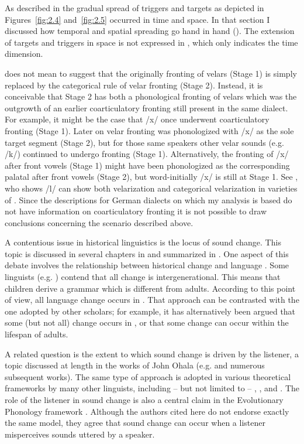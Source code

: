 \begin{xlist}
\begin{xlist}
As described in  the gradual spread of triggers and targets as depicted in Figures~\ref{fig:2.4} and~\ref{fig:2.5} occurred in time and space. In that section I discussed how temporal and spatial spreading go hand in hand (). The extension of targets and triggers in space is not expressed in , which only indicates the time dimension.

 does not mean to suggest that the originally  fronting of velars (Stage 1) is simply replaced by the categorical rule of velar fronting (Stage 2). Instead, it is conceivable that Stage 2 has both a phonological fronting of velars which was the outgrowth of an earlier coarticulatory fronting still present in the same dialect. For example, it might be the case that /x/ once underwent coarticulatory fronting (Stage 1). Later on velar fronting was phonologized with /x/ as the sole target segment (Stage 2), but for those same speakers other velar sounds (e.g. /k/) continued to undergo  fronting (Stage 1). Alternatively, the  fronting of /x/ after front vowels (Stage 1) might have been phonologized as the corresponding palatal after front vowels (Stage 2), but word-initially /x/ is still at Stage 1. See \citet{Turton2017}, who shows /l/ can show both  velarization and categorical velarization in varieties of . Since the descriptions for German dialects on which my analysis is based do not have information on coarticulatory fronting it is not possible to draw conclusions concerning the scenario described above.

A contentious issue in historical linguistics is the locus of sound change. This topic is discussed in several chapters in \citet{HoneyboneSalmons2015a} and summarized in \citet[8--9]{HoneyboneSalmons2015b}. One aspect of this debate involves the relationship between historical change and language . Some linguists (e.g. \citealt{HaleReiss2015}) contend that all change is intergenerational. This means that children derive a grammar which is different from adults. According to this point of view, all language change occurs in . That approach can be contrasted with the one adopted by other scholars; for example, it has alternatively been argued that some (but not all) change occurs in , or that some change can occur within the lifespan of adults.

A related question is the extent to which sound change is driven by the listener, a topic discussed at length in the works of John Ohala (e.g. \citealt{Ohala1981} and numerous subsequent works). The same type of approach is adopted in various theoretical frameworks by many other linguists, including -- but not limited to -- \citet{Holt1997}, \citet{HumeJohnson2001}, and \citet{Hamann2009}. The role of the listener in sound change is also a central claim in the Evolutionary Phonology framework \citep{Blevins2004}. Although the authors cited here do not endorse exactly the same model, they agree that sound change can occur when a listener misperceives sounds uttered by a speaker.


\end{xlist}
\end{xlist}
